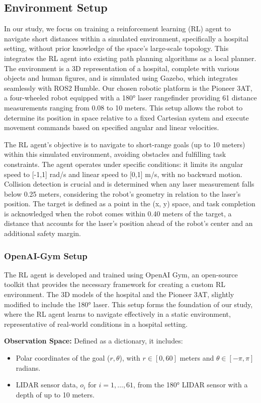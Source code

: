\documentclass[conference]{IEEEtran}
\begin{document}
\subsection{Environment Setup}
In our study, we focus on training a reinforcement learning (RL) agent to navigate short distances within a simulated environment, specifically a hospital setting, without prior knowledge of the space's large-scale topology. This  integrates the RL agent into existing path planning algorithms as a local planner. The environment is a 3D representation of a hospital, complete with various objects and human figures, and is simulated using Gazebo, which integrates seamlessly with ROS2 Humble. Our chosen robotic platform is the Pioneer 3AT, a four-wheeled robot equipped with a 180° laser rangefinder providing 61 distance measurements ranging from 0.08 to 10 meters. This setup allows the robot to determine its position in space relative to a fixed Cartesian system and execute movement commands based on specified angular and linear velocities.

The RL agent's objective is to navigate to short-range goals (up to 10 meters) within this simulated environment, avoiding obstacles and fulfilling task constraints. The agent operates under specific conditions: it limits its angular speed to [-1,1] rad/s and linear speed to [0,1] m/s, with no backward motion. Collision detection is crucial and is determined when any laser measurement falls below 0.25 meters, considering the robot's geometry in relation to the laser's position. The target is defined as a point in the (x, y) space, and task completion is acknowledged when the robot comes within 0.40 meters of the target, a distance that accounts for the laser's position ahead of the robot's center and an additional safety margin.

\subsubsection{\textbf{OpenAI-Gym Setup}}
The RL agent is developed and trained using OpenAI Gym, an open-source toolkit that provides the necessary framework for creating a custom RL environment. The 3D models of the hospital and the Pioneer 3AT, slightly modified to include the 180° laser. This setup forms the foundation of our study, where the RL agent learns to navigate effectively in a static environment, representative of real-world conditions in a hospital setting.

\textbf{Observation Space:} Defined as a dictionary, it includes:
\begin{itemize}
    \item Polar coordinates of the goal (\(r, \theta\)), with \(r \in [0, 60]\) meters and \(\theta \in [-\pi, \pi]\) radians.
    \item LIDAR sensor data, \(o_i\) for \(i = 1, \ldots, 61\), from the 180° LIDAR sensor with a depth of up to 10 meters.
\end{itemize}
\end{document}
